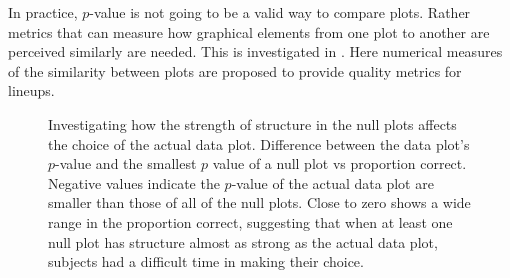 \documentclass[12pt]{article}
\newcommand{\blue}[1]{{\color{blue} #1}} %
\newcommand{\green}[1]{{\color{green} #1}} %
\begin{document}



In practice, $p$-value is not going to be a valid way to compare plots. Rather metrics that can measure how graphical elements from one plot to another are perceived similarly are needed. This is investigated in \citet{niladri:2012}. Here numerical measures of the similarity between plots are proposed to provide quality metrics for lineups.


\begin{figure}[hbtp]
   \centering
       \caption{Investigating how the strength of structure in the null plots affects the choice of the actual data plot. Difference between the data plot's $p$-value and the  smallest $p$ value of a null plot vs proportion correct. Negative values indicate the $p$-value of the actual data plot are smaller than those of all of the null plots. Close to zero shows a wide range in the proportion correct, suggesting that when at least one null plot has structure almost as strong as the actual data plot, subjects had a difficult time in making their choice.}
       \label{fig:pval_difference}
\end{figure}
\end{document}
